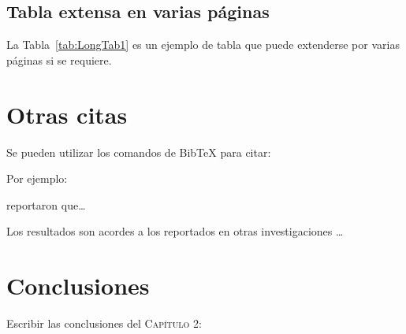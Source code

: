 \newpage
\subsection{Tabla extensa en varias páginas}
La Tabla~\ref{tab:LongTab1} es un ejemplo de tabla que puede extenderse por varias páginas si se requiere. 





\section{Otras citas}
Se pueden utilizar los comandos de Bib{\TeX} para citar:

\citep{iqbal2011evaluation, kamboj2014physicochemical, malunga2017effect, moate2011influence}

\citet{dima2016kinetics}

Por ejemplo:

\citet{ahmadi2012development, zhou2014validation, bagchi2016studies} reportaron que\ldots

Los resultados son acordes a los reportados en otras investigaciones \citep{vsimkovic2011positively, hromadkova2013structural, xiong2013antioxidant, coelho2016revisiting}\ldots


\section{Conclusiones}
Escribir las conclusiones del \textsc{Capítulo 2}: \lipsum[2]

\begin{refcontext}[sorting=nyt]
\printbibliography[title={Referencias}, heading=subbibintoc]
\end{refcontext}
